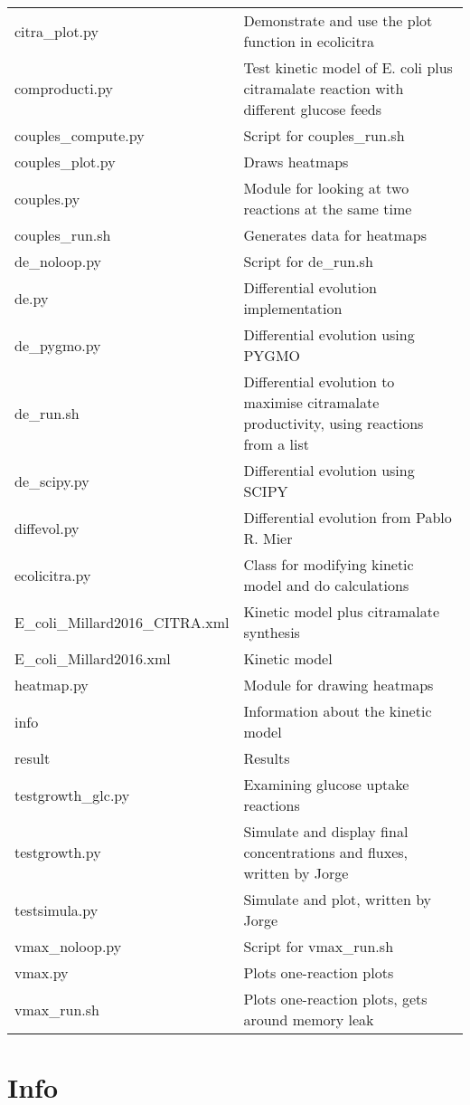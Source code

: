 \documentclass[a4paper, parskip=full]{scrreprt}
\begin{document}
\begin{tabularx}{\linewidth}{LL}
citra\_plot.py & Demonstrate and use the plot function in ecolicitra\\
comproducti.py & Test kinetic model of E. coli plus citramalate reaction with different glucose feeds\\
couples\_compute.py & Script for couples\_run.sh\\
couples\_plot.py & Draws heatmaps\\
couples.py & Module for looking at two reactions at the same time\\
couples\_run.sh & Generates data for heatmaps\\
de\_noloop.py & Script for de\_run.sh\\
de.py & Differential evolution implementation\\
de\_pygmo.py & Differential evolution using PYGMO\\
de\_run.sh & Differential evolution to maximise citramalate productivity, using reactions from a list\\
de\_scipy.py & Differential evolution using SCIPY\\
diffevol.py & Differential evolution from Pablo R. Mier\\
ecolicitra.py & Class for modifying kinetic model and do calculations\\
E\_coli\_Millard2016\_CITRA.xml & Kinetic model plus citramalate synthesis\\
E\_coli\_Millard2016.xml & Kinetic model\\
heatmap.py & Module for drawing heatmaps\\
info & Information about the kinetic model\\
result & Results\\
testgrowth\_glc.py & Examining glucose uptake reactions\\
testgrowth.py & Simulate and display final concentrations and fluxes, written by Jorge\\
testsimula.py & Simulate and plot, written by Jorge \\
vmax\_noloop.py & Script for vmax\_run.sh\\
vmax.py & Plots one-reaction plots\\
vmax\_run.sh & Plots one-reaction plots, gets around memory leak
\end{tabularx}

\section{Info}
\label{sec:kininfo}
\end{document}
